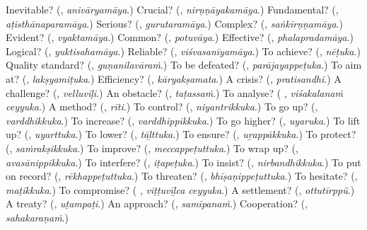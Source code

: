 \begin{tcolorbox}[breakable,colback=teal!4,colframe=teal!35!black,title={Before you move on}]
Inevitable? (\textbf{}, \emph{anivāryamāya}.) Crucial? (\textbf{}, \emph{nirṇṇāyakamāya}.) Fundamental? (\textbf{}, \emph{aṭisthānaparamāya}.) Serious? (\textbf{}, \emph{gurutaramāya}.) Complex? (\textbf{}, \emph{saṅkīrṇṇamāya}.) Evident? (\textbf{}, \emph{vyaktamāya}.) Common? (\textbf{}, \emph{potuvāya}.) Effective? (\textbf{}, \emph{phalapradamāya}.) Logical? (\textbf{}, \emph{yuktisahamāya}.) Reliable? (\textbf{}, \emph{viśvasanīyamāya}.) To achieve? (\textbf{}, \emph{nēṭuka}.) Quality standard? (\textbf{}, \emph{guṇanilavāraṁ}.) To be defeated? (\textbf{}, \emph{parājayappeṭuka}.) To aim at? (\textbf{}, \emph{lakṣyamiṭuka}.) Efficiency? (\textbf{}, \emph{kāryakṣamata}.) A crisis? (\textbf{}, \emph{pratisandhi}.) A challenge? (\textbf{}, \emph{velluviḷi}.) An obstacle? (\textbf{}, \emph{taṭassaṁ}.) To analyse? (\textbf{ }, \emph{viśakalanaṁ ceyyuka}.) A method? (\textbf{}, \emph{rīti}.) To control? (\textbf{}, \emph{niyantrikkuka}.) To go up? (\textbf{}, \emph{varddhikkuka}.) To increase? (\textbf{}, \emph{varddhippikkuka}.) To go higher? (\textbf{}, \emph{uyaruka}.) To lift up? (\textbf{}, \emph{uyarttuka}.) To lower? (\textbf{}, \emph{tāḻttuka}.) To ensure? (\textbf{}, \emph{uṟappākkuka}.) To protect? (\textbf{}, \emph{saṁrakṣikkuka}.) To improve? (\textbf{}, \emph{meccappeṭuttuka}.) To wrap up? (\textbf{}, \emph{avasānippikkuka}.) To interfere? (\textbf{}, \emph{iṭapeṭuka}.) To insist? (\textbf{}, \emph{nirbandhikkuka}.) To put on record? (\textbf{}, \emph{rēkhappeṭuttuka}.) To threaten? (\textbf{}, \emph{bhīṣaṇippeṭuttuka}.) To hesitate? (\textbf{}, \emph{maṭikkuka}.) To compromise? (\textbf{ }, \emph{viṭṭuvīḻca ceyyuka}.) A settlement? (\textbf{}, \emph{ottutīrppŭ}.) A treaty? (\textbf{}, \emph{uṭampaṭi}.) An approach? (\textbf{}, \emph{samīpanaṁ}.) Cooperation? (\textbf{}, \emph{sahakaraṇaṁ}.)
\end{tcolorbox}

